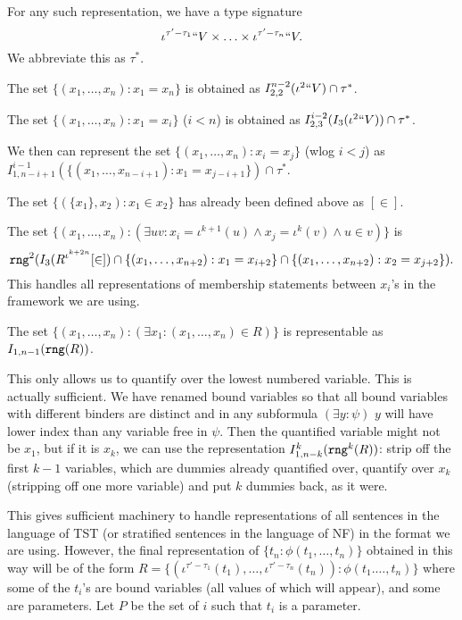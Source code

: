 \documentclass{article}
\theoremstyle{definition}
\theoremstyle{remark}
\begin{document}
For any such representation, we have a type signature $$\iota^{\tau'-\tau_1}``V \times \ldots \times \iota^{\tau'-\tau_n}``V.$$  We abbreviate this as $\tau^*$.

The set $\{(x_1,\ldots,x_n):x_1 = x_n\}$ is obtained as $I_{2,2}^{n-2}(\iota^2``V)\cap \tau^*$.

The set $\{(x_1,\dots,x_n):x_1 = x_i\}$ ($i<n$) is obtained as $I_{2,3}^{i-2}(I_3(\iota^2``V))\cap \tau^*$.

We then can represent the
set $\{(x_1,\ldots,x_n):x_i = x_j\}$ (wlog $i<j$) as \newline $I_{1,n-i+1}^{i-1}(\{(x_1,\ldots,x_{n-i+1}):x_1 = x_{j-i+1}\})\cap \tau^*$.

The set $\{(\{x_1\},x_2):x_1 \in x_2\}$ has already been defined above as $[\in]$.

The set $\{(x_1,\ldots,x_n):(\exists uv:x_i = \iota^{k+1}(u) \wedge x_j = \iota^k(v) \wedge u\in v)\}$ is
$${\tt rng}^2(I_3(R^{\iota^{k+2n}}[\in]) \cap \{(x_1,\ldots,x_{n+2}):x_1 = x_{i+2}\} \cap \{(x_1,\ldots,x_{n+2}):x_2=x_{j+2}\}).$$   This
handles all representations of membership statements between $x_i$'s  in the framework we are using.

The set $\{(x_1,\ldots,x_n):(\exists x_1:(x_1,\ldots,x_n)\in R)\}$ is representable as $I_{1,n-1}({\tt rng}(R))$.

This only allows us to quantify over the lowest numbered variable.  This is actually sufficient.  We have renamed bound variables so that all bound variables with different binders are distinct
and in any subformula $(\exists y:\psi)$ $y$ will have lower index than any variable  free in $\psi$.  Then the quantified variable might not be $x_1$, but if it is $x_k$,
we can use the representation $I^{k}_{1,n-k}({\tt rng}^k(R))$:  strip off the first $k-1$ variables, which are dummies already quantified over,
quantify over $x_k$ (stripping off one more variable) and put $k$ dummies back, as it were.

This gives sufficient machinery to handle representations of all sentences in the language of TST (or stratified sentences in the language of NF) in the format we are using.  However, the final representation of  $\{t_n:\phi(t_1,\ldots,t_n)\}$ obtained in this way
will be of the form $R=\{(\iota^{\tau'-\tau_1}(t_1),\ldots,\iota^{\tau'-\tau_n}(t_n)):\phi(t_1.\ldots,t_n)\}$
where some of the $t_i$'s are bound variables (all values of which will appear), and some are parameters.  Let $P$ be the set  of $i$ such that
$t_i$ is a parameter.
\end{document}
